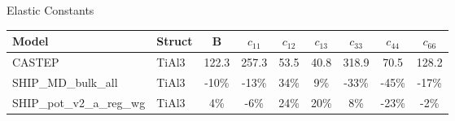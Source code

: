 \documentclass[preview]{standalone}
\begin{document}
\begin{center}
\textnormal{Elastic Constants} \\
\vspace{2mm}
\begin{tabular}{ l l c c c c c c c } \toprule 
Model & Struct & B & $c_{11}$ & $c_{12}$ & $c_{13}$ & $c_{33}$ & $c_{44}$ & $c_{66}$\\ \midrule 
CASTEP & TiAl3 & 122.3 & 257.3 & 53.5 & 40.8 & 318.9 & 70.5 & 128.2\\ 
SHIP\_MD\_bulk\_all & TiAl3 & -10\% & -13\% & 34\% & 9\% & -33\% & -45\% & -17\%\\ 
SHIP\_pot\_v2\_a\_reg\_wg & TiAl3 & 4\% & -6\% & 24\% & 20\% & 8\% & -23\% & -2\%\\ 
\end{tabular} \bigskip 
\end{center}
\end{document}
